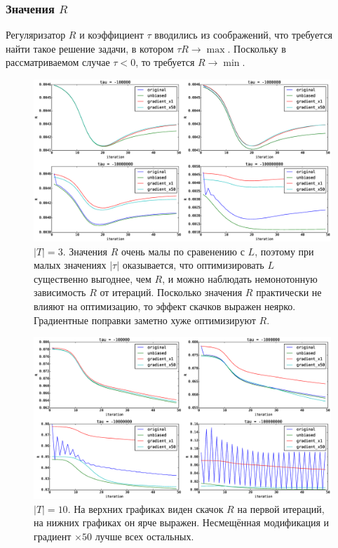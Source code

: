 \documentclass[12pt]{article}
\begin{document}
\subsubsection{Значения $R$}
Регуляризатор $R$ и коэффициент $\tau$  вводились из соображений, что требуется найти такое решение задачи, в котором $\tau R \to \max$. Поскольку в рассматриваемом случае $\tau < 0$, то требуется $R \to \min$.\\
\begin{figure}[H]
	\centering
	\caption{$|T| = 3$. Значения $R$ очень малы по сравенению с $L$, поэтому при малых значениях $|\tau|$ оказывается, что оптимизировать $L$ существенно выгоднее, чем $R$, и можно наблюдать немонотонную зависимость $R$ от итераций. Посколько значения $R$ практически не влияют на оптимизацию, то эффект скачков выражен неярко. Градиентные поправки заметно хуже оптимизируют $R$.}    
	\medskip
	\includegraphics[width=1.0\linewidth]{pictures/topics_3_R_values}
\end{figure}
\begin{figure}[H]
	\centering
	\caption{$|T| = 10$. На верхних графиках виден скачок $R$ на первой итераций, на нижних графиках он ярче выражен. Несмещённая модификация и градиент $\times 50$  лучше всех остальных.}    
	\includegraphics[width=1.0\linewidth]{pictures/topics_10_R_values}
\end{figure}
\end{document}
